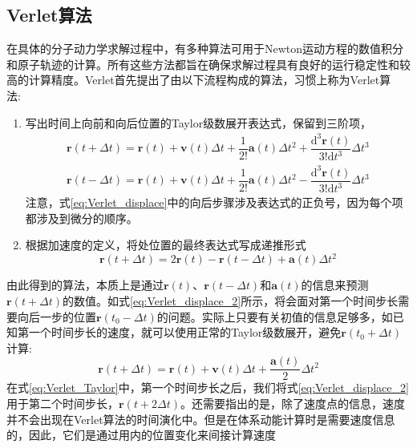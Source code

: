 \subsection{\rm{Verlet}算法}
在具体的分子动力学求解过程中，有多种算法可用于\textrm{Newton}运动方程的数值积分和原子轨迹的计算。所有这些方法都旨在确保求解过程具有良好的运行稳定性和较高的计算精度。\textrm{Verlet}\cite{PR159-98_1967}首先提出了由以下流程构成的算法，习惯上称为\textrm{Verlet}算法:~
\begin{enumerate}
	\item 写出时间上向前和向后位置的\textrm{Taylor}级数展开表达式，保留到三阶项，
		\begin{equation}
			\begin{aligned}
				\mathbf{r}(t+\Delta t)=\mathbf{r}(t)+\mathbf{v}(t)\Delta t+\dfrac1{2!}\mathbf{a}(t)\Delta t^2+\dfrac{\mathrm{d}^3\mathbf{r}(t)}{3!\mathrm{d}t^3}\Delta t^3\\
				\mathbf{r}(t-\Delta t)=\mathbf{r}(t)+\mathbf{v}(t)\Delta t+\dfrac1{2!}\mathbf{a}(t)\Delta t^2-\dfrac{\mathrm{d}^3\mathbf{r}(t)}{3!\mathrm{d}t^3}\Delta t^3
			\end{aligned}
			\label{eq:Verlet_displace}
		\end{equation}
		注意，式\eqref{eq:Verlet_displace}中的向后步骤涉及表达式的正负号，因为每个项都涉及到微分的顺序。
	\item 根据加速度的定义，将处位置的最终表达式写成递推形式
		\begin{equation}
			\mathbf{r}(t+\Delta t)=2\mathbf{r}(t)-\mathbf{r}(t-\Delta t)+\mathbf{a}(t)\Delta t^2
			\label{eq:Verlet_displace_2}
		\end{equation}
\end{enumerate}
由此得到的算法，本质上是通过$\mathbf{r}(t)$、$\mathbf{r}(t-\Delta t)$和$\mathbf{a}(t)$的信息来预测$\mathbf{r}(t+\Delta t)$的数值。如式\eqref{eq:Verlet_displace_2}所示，将会面对第一个时间步长需要向后一步的位置$\mathbf{r}(t_0-\Delta t)$的问题。实际上只要有关初值的信息足够多，如已知第一个时间步长的速度，就可以使用正常的\textrm{Taylor}级数展开，避免$\mathbf{r}(t_0+\Delta t)$计算:
\begin{equation}
	\mathbf{r}(t+\Delta t)=\mathbf{r}(t)+\mathbf{v}(t)\Delta t+\dfrac{\mathbf{a}(t)}2\Delta t^2
	\label{eq:Verlet_Taylor}
\end{equation}
在式\eqref{eq:Verlet_Taylor}中，第一个时间步长之后，我们将式\eqref{eq:Verlet_displace_2}用于第二个时间步长，$\mathbf{r}(t+2\Delta t)$。还需要指出的是，除了速度点的信息，速度并不会出现在\textrm{Verlet}算法的时间演化中。但是在体系动能计算时是需要速度信息的，因此，它们是通过用内的位置变化来间接计算速度

